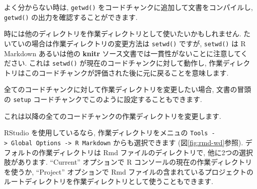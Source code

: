 \documentclass[
  11pt,
]{bxjsreport}
\newenvironment{Shaded}{\begin{snugshade}}{\end{snugshade}}
\newcommand{\InformationTok}[1]{\textcolor[rgb]{0.56,0.35,0.01}{\textbf{\textit{#1}}}}
\begin{document}
よく分からない時は, \texttt{getwd()} をコードチャンクに追加して文書をコンパイルし, \texttt{getwd()} の出力を確認することができます.

時には他のディレクトリを作業ディレクトリとして使いたいかもしれません. たいていの場合は作業ディレクトリの変更方法は \texttt{setwd()} ですが, \texttt{setwd()} は R Markdown あるいは他の \textbf{knitr} ソース文書では一貫性がないことに注意してください. これは \texttt{setwd()} が現在のコードチャンクに対して動作し, 作業ディレクトリはこのコードチャンクが評価された後に元に戻ることを意味します.

全てのコードチャンクに対して作業ディレクトリを変更したい場合, 文書の冒頭の \texttt{setup} コードチャンクでこのように設定することもできます.

\begin{Shaded}
\end{Shaded}

これは以降の全てのコードチャンクの作業ディレクトリを変更します.

RStudio を使用しているなら, 作業ディレクトリをメニュの \texttt{Tools -\textgreater{}\ Global\ Options\ -\textgreater{}\ R\ Markdown} からも選択できます (図\ref{fig:rmd-wd}参照). デフォルトの作業ディレクトリは Rmd ファイルのディレクトリで, 他に2つの選択肢があります. ``Current'' オプションで R コンソールの現在の作業ディレクトリを使うか, ``Project'' オプションで Rmd ファイルの含まれているプロジェクトのルートディレクトリを作業ディレクトリとして使うこともできます.
\end{document}
